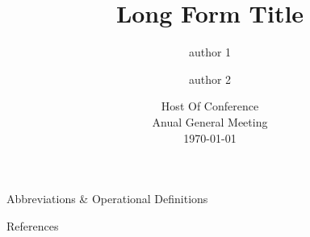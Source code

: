 \documentclass[
                aspectratio=169, 
                14pt,
                ]{beamer}
\title[Short Form Title]{
  Long Form Title
  }
\author[author 1 \and author 2]{ author 1 \and author 2}
\date{\footnotesize Host Of Conference\\ Anual General Meeting\\ \today}
\begin{document}
\begin{frame}[shrink=20]
    \titlepage
\end{frame}




\begin{frame}[shrink=40]{Abbreviations \& Operational Definitions}

    \begin{multicols}{2}
    \printglossary[type=\acronymtype, title=Keywords]

    \printglossary[title=Operational Definitions]

    \end{multicols}

\end{frame}












% 

% 

% 

% 

% 

          
\begin{frame}{References}
\printbibliography
  
\end{frame}


% 


% 


% 
\end{document}
